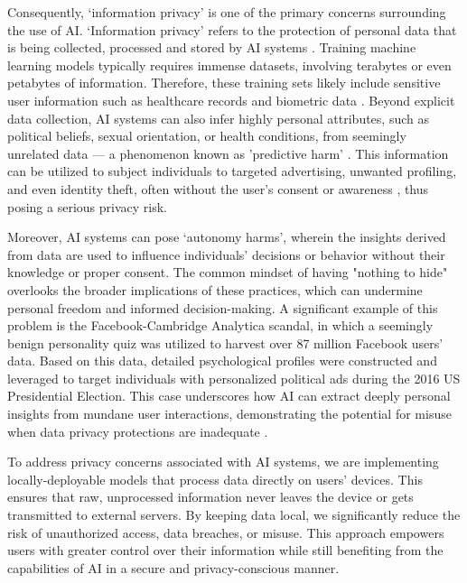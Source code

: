 \documentclass[licencjacka,en]{pracamgr}
\begin{document}
Consequently, ‘information privacy’ is one of the primary concerns surrounding the use of AI. ‘Information privacy’ refers to the protection of personal data that is being collected, processed and stored by AI systems \cite{transcend}. Training machine learning models typically requires immense datasets, involving terabytes or even petabytes of information. Therefore, these training sets likely include sensitive user information such as healthcare records and biometric data \cite{ibm_vast_data}. Beyond explicit data collection, AI systems can also infer highly personal attributes, such as political beliefs, sexual orientation, or health conditions, from seemingly unrelated data — a phenomenon known as 'predictive harm' \cite{transcend}. This information can be utilized to subject individuals to targeted advertising, unwanted profiling, and even identity theft, often without the user’s consent or awareness \cite{data_guard}, thus posing a serious privacy risk.

Moreover, AI systems can pose ‘autonomy harms’, wherein the insights derived from data are used to influence individuals' decisions or behavior without their knowledge or proper consent. The common mindset of having "nothing to hide" overlooks the broader implications of these practices, which can undermine personal freedom and informed decision-making. A significant example of this problem is the Facebook-Cambridge Analytica scandal, in which a seemingly benign personality quiz was utilized to harvest over 87 million Facebook users’ data. Based on this data, detailed psychological profiles were constructed and leveraged to target individuals with personalized political ads during the 2016 US Presidential Election. This case underscores how AI can extract deeply personal insights from mundane user interactions, demonstrating the potential for misuse when data privacy protections are inadequate \cite{transcend}.

To address privacy concerns associated with AI systems, we are implementing locally-deployable models that process data directly on users' devices. This ensures that raw, unprocessed information never leaves the device or gets transmitted to external servers. By keeping data local, we significantly reduce the risk of unauthorized access, data breaches, or misuse. This approach empowers users with greater control over their information while still benefiting from the capabilities of AI in a secure and privacy-conscious manner. 
\end{document}
